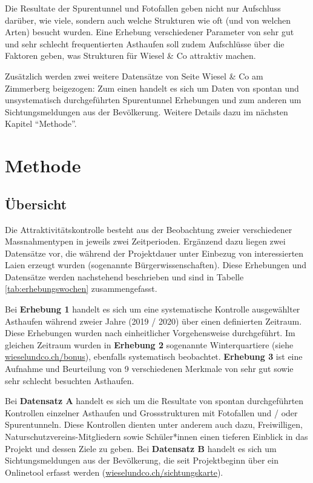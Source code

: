 \documentclass[
  oneside]{scrbook}
\begin{document}
Die Resultate der Spurentunnel und Fotofallen geben nicht nur Aufschluss darüber, wie viele, sondern auch welche Strukturen wie oft (und von welchen Arten) besucht wurden. Eine Erhebung verschiedener Parameter von sehr gut und sehr schlecht frequentierten Asthaufen soll zudem Aufschlüsse über die Faktoren geben, was Strukturen für Wiesel \& Co attraktiv machen.

Zusätzlich werden zwei weitere Datensätze von Seite Wiesel \& Co am Zimmerberg beigezogen: Zum einen handelt es sich um Daten von spontan und unsystematisch durchgeführten Spurentunnel Erhebungen und zum anderen um Sichtungsmeldungen aus der Bevölkerung. Weitere Details dazu im nächsten Kapitel ``Methode''.

\hypertarget{methode}{%
\chapter{Methode}\label{methode}}

\hypertarget{uxfcbersicht}{%
\section{Übersicht}\label{uxfcbersicht}}

Die Attraktivitätskontrolle besteht aus der Beobachtung zweier verschiedener Massnahmentypen in jeweils zwei Zeitperioden. Ergänzend dazu liegen zwei Datensätze vor, die während der Projektdauer unter Einbezug von interessierten Laien erzeugt wurden (sogenannte Bürgerwissenschaften). Diese Erhebungen und Datensätze werden nachstehend beschrieben und sind in Tabelle \ref{tab:erhebungswochen} zusammengefasst.

Bei \textbf{Erhebung 1} handelt es sich um eine systematische Kontrolle ausgewählter Asthaufen während zweier Jahre (2019 / 2020) über einen definierten Zeitraum. Diese Erhebungen wurden nach einheitlicher Vorgehensweise durchgeführt. Im gleichen Zeitraum wurden in \textbf{Erhebung 2} sogenannte Winterquartiere (siehe \href{http://www.wieselundco.ch/bonus}{wieselundco.ch/bonus}), ebenfalls systematisch beobachtet. \textbf{Erhebung 3} ist eine Aufnahme und Beurteilung von 9 verschiedenen Merkmale von sehr gut sowie sehr schlecht besuchten Asthaufen.

Bei \textbf{Datensatz A} handelt es sich um die Resultate von spontan durchgeführten Kontrollen einzelner Asthaufen und Grossstrukturen mit Fotofallen und / oder Spurentunneln. Diese Kontrollen dienten unter anderem auch dazu, Freiwilligen, Naturschutzvereins-Mitgliedern sowie Schüler*innen einen tieferen Einblick in das Projekt und dessen Ziele zu geben. Bei \textbf{Datensatz B} handelt es sich um Sichtungsmeldungen aus der Bevölkerung, die seit Projektbeginn über ein Onlinetool erfasst werden (\href{http://www.wieselundco.ch/beobachtung}{wieselundco.ch/sichtungskarte}).
\end{document}
